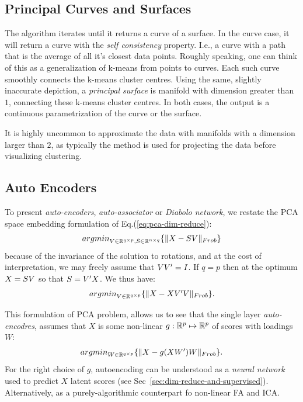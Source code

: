 \documentclass[12pt,a4paper]{article}
\begin{document}
\subsection{Principal Curves and Surfaces}
The algorithm iterates until it returns a curve of a surface.
In the curve case, it will return a curve with the \emph{self consistency} property. 
I.e., a curve with a path that is the average of all it's closest data points.
Roughly speaking, one can think of this as a generalization of k-means from points to curves. 
Each such curve smoothly connects the k-means cluster centres.
Using the same, slightly inaccurate depiction, a \emph{principal surface} is manifold with dimension greater than $1$, connecting these k-means cluster centres.
In both cases, the output is a continuous parametrization of the curve or the surface.

It is highly uncommon to approximate the data with manifolds with a dimension larger than $2$, as typically the method is used for projecting the data before visualizing \andor clustering.





\subsection{Auto Encoders}
\label{sec:auto_encoders}

To present \emph{auto-encoders}, \aka \emph{auto-associator} or \emph{Diabolo network}, we restate the PCA space embedding formulation of Eq.(\ref{eq:pca-dim-reduce}):
\begin{align}
	\textstyle{\mathop{argmin}_{V\in \mathbb{R}^{q \times p}, S\in \mathbb{R}^{n \times q}}}\{ \Vert X- S V \Vert_{Frob} \}
\end{align}
because of the invariance of the solution to rotations, and at the cost of interpretation, we may freely assume that $V V'=I$.
If $q=p$ then at the optimum $X=S V$ so that $S=V' X$. We thus have:
\begin{align}
	\textstyle{\mathop{argmin}_{V\in \mathbb{R}^{q \times p}}}\{ \Vert X- XV'V \Vert_{Frob} \}.
\end{align}

This formulation of PCA problem, allows us to see that the single layer \emph{auto-encodres}, assumes that $X$ is some non-linear $g:\mathbb{R}^p \mapsto \mathbb{R}^p$ of scores with loadings $W$:
\begin{align}
	\textstyle{\mathop{argmin}_{W\in \mathbb{R}^{q\times p}}}\{ \Vert X- g(XW')W \Vert_{Frob} \}.
\end{align}
For the right choice of $g$, autoencoding can be understood as a \emph{neural network} used to predict $X$ latent scores (see Sec~\ref{sec:dim-reduce-and-supervised}).
Alternatively, as a purely-algorithmic counterpart fo non-linear FA and ICA.
\end{document}
